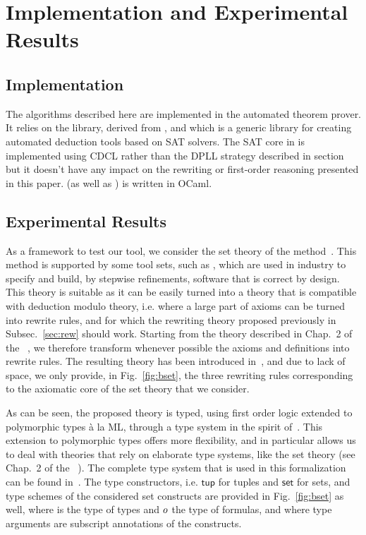 
\section{Implementation and Experimental Results}
\label{sec:bench}

\subsection{Implementation}

The algorithms described here are implemented in the
\archsat{} automated theorem prover. It relies on the
\msat{}\cite{mSAT} library, derived from \altergoz{}, and which is a
generic library for creating automated deduction tools based on SAT
solvers. The SAT core in \msat{} is implemented using CDCL rather
than the DPLL strategy described in section\label{sec:smt} but it
doesn't have any impact on the rewriting or first-order reasoning
presented in this paper. \archsat{} (as well as \msat{}) is written
in OCaml.

\subsection{Experimental Results}

As a framework to test our tool, we consider the set theory of the \bmth{}
method~\cite{B-Book}. This method is supported by some tool sets, such as
\atelierb{}, which are used in industry to specify and build, by stepwise
refinements, software that is correct by design. This theory is suitable as it
can be easily turned into a theory that is compatible with deduction modulo
theory, i.e. where a large part of axioms can be turned into rewrite rules, and
for which the rewriting theory proposed previously in Subsec.~\ref{sec:rew}
should work. Starting from the theory described in Chap.~2 of the
\bbook{}~\cite{B-Book}, we therefore transform whenever possible the axioms and
definitions into rewrite rules. The resulting theory has been introduced
in~\cite{BA15}, and due to lack of space, we only provide, in
Fig.~\ref{fig:bset}, the three rewriting rules corresponding to the axiomatic
core of the \bmth{} set theory that we consider.

As can be seen, the proposed theory is typed, using first order logic extended
to polymorphic types à la ML, through a type system in the spirit
of~\cite{BP13}. This extension to polymorphic types offers more flexibility, and
in particular allows us to deal with theories that rely on elaborate type
systems, like the \bmth{} set theory (see Chap.~2 of the
\bbook{}~\cite{B-Book}). The complete type system that is used in this
formalization can be found in~\cite{BA15}. The type constructors,
i.e. $\mathsf{tup}$ for tuples and $\mathsf{set}$ for sets, and type schemes of
the considered set constructs are provided in Fig.~\ref{fig:bset} as well, where
\type{} is the type of types and $o$ the type of formulas, and where type
arguments are subscript annotations of the constructs.


